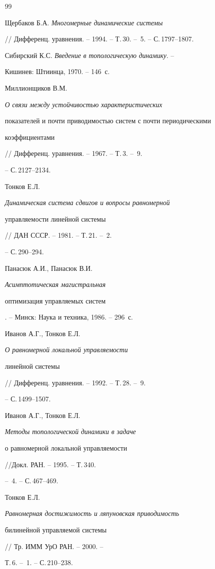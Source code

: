 \begin{thebibliography}{99}


Щербаков Б.А. {\em Многомерные динамические системы}


// Дифференц. уравнения. -- 1994. -- Т.\,30. -- \No\,5. -- С.\,1797--1807.




Сибирский К.С. {\em Введение в топологическую динамику}. --


Кишинев: Штиинца, 1970. -- 146~с.




Миллионщиков В.М. {\em О связи между устойчивостью характеристических


показателей и почти приводимостью систем с почти периодическими


коэффициентами} // Дифференц. уравнения. -- 1967. -- Т.\,3. -- \No\,9.


-- С.\,2127--2134.




Тонков Е.Л. {\em Динамическая система сдвигов и вопросы равномерной


управляемости линейной системы} // ДАН СССР. -- 1981. -- Т.\,21. -- \No\,2.


-- С.\,290--294.




Панасюк А.И., Панасюк В.И. {\em Асимптотическая магистральная


оптимизация управляемых систем}. -- Минск: Наука и техника, 1986. -- 296~с.




Иванов А.Г., Тонков Е.Л. {\em О равномерной локальной управляемости


линейной системы} // Дифференц. уравнения. -- 1992. -- Т.\,28. -- \No\,9.


-- С.\,1499--1507.




Иванов А.Г., Тонков Е.Л. {\em Методы топологической динамики в задаче


о равномерной локальной управляемости} //Докл. РАН. -- 1995. -- Т.\,340.


-- \No\,4. -- С.\,467--469.




Тонков Е.Л. {\em Равномерная достижимость и ляпуновская приводимость


билинейной управляемой системы} // Тр. ИММ УрО РАН. -- 2000. --


Т.\,6. -- \No\,1. -- С.\,210--238.



\end{thebibliography}
